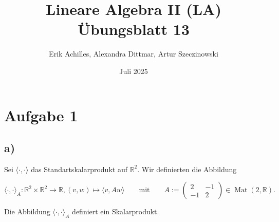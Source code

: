 \documentclass{article}
\title{Lineare Algebra II (LA) Übungsblatt 13}
\author{Erik Achilles, Alexandra Dittmar, Artur Szeczinowski}
\date{Juli 2025}
\newcommand{\RR}{\mathbb{R}}
\DeclareMathOperator{\Mat}{Mat}
\begin{document}
\section*{Aufgabe 1}

 \subsection*{a)}
 Sei
 $\langle \cdot, \cdot \rangle$
 das Standartskalarprodukt auf
 $\RR^2$.
 Wir definierten die Abbildung

 \[
 \langle \cdot, \cdot \rangle_A :
 \RR^2 \times \RR^2
 \to \RR,
 (v,w) \mapsto \langle v, Aw \rangle
 \qquad \text{mit} \qquad
 A :=
 \begin{pmatrix}
    2 & -1 \\ -1 & 2
 \end{pmatrix}
 \in \Mat(2,\RR).
 \]

 Die Abbildung
 $\langle \cdot, \cdot \rangle_A$
 definiert ein Skalarprodukt.
\end{document}
